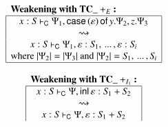 \documentclass{lmcs}
\newcommand{\DualLNLLogicnt}[1]{\mathit{#1}}
\newcommand{\DualLNLLogicmv}[1]{\mathit{#1}}
\newcommand{\DualLNLLogicsym}[1]{#1}
\newcommand{\DualLNLLogicdrulename}[1]{\textsc{#1}}
\newcommand{\DualLNLLogicdruleTCXXdIOneName}[0]{\DualLNLLogicdrulename{TC\_dI1}}
\newcommand{\DualLNLLogicdruleTCXXdEName}[0]{\DualLNLLogicdrulename{TC\_dE}}
\renewcommand{\DualLNLLogicdrulename}[1]{#1}
\renewcommand{\DualLNLLogicdruleTCXXdIOneName}{\text{TC\_}+_{I_1}}
\renewcommand{\DualLNLLogicdruleTCXXdEName}{\text{TC\_}+_E}
\begin{document}
\begin{figure}
  \begin{mdframed}
    \begin{center}
    \begin{math}
      \begin{array}{c}    
        \begin{array}{|c|}
          \multicolumn{1}{l}{\textbf{\textbf{Weakening with $\DualLNLLogicdruleTCXXdEName{}$}:}}\\
          \hline
            \DualLNLLogicmv{x}  :  \DualLNLLogicnt{S}  \vdash_{\mathsf{C} }  \Psi_{{\mathrm{1}}}  \DualLNLLogicsym{,}   \mathsf{case}\, \DualLNLLogicsym{(}   \varepsilon   \DualLNLLogicsym{)} \,\mathsf{of}\, \DualLNLLogicmv{y} . \Psi_{{\mathrm{2}}} ,  \DualLNLLogicmv{z} . \Psi_{{\mathrm{3}}}  \\
           \rightsquigarrow\\
            \DualLNLLogicmv{x}  :  \DualLNLLogicnt{S}  \vdash_{\mathsf{C} }  \Psi_{{\mathrm{1}}}  \DualLNLLogicsym{,}   \varepsilon   \DualLNLLogicsym{:}  \DualLNLLogicnt{S_{{\mathrm{1}}}}  \DualLNLLogicsym{,} \, ... \, \DualLNLLogicsym{,}   \varepsilon   \DualLNLLogicsym{:}  \DualLNLLogicnt{S_{\DualLNLLogicmv{i}}} \\
           \text{where } \DualLNLLogicsym{\mbox{$\mid$}}  \Psi_{{\mathrm{2}}}  \DualLNLLogicsym{\mbox{$\mid$}}  \DualLNLLogicsym{=}  \DualLNLLogicsym{\mbox{$\mid$}}  \Psi_{{\mathrm{3}}}  \DualLNLLogicsym{\mbox{$\mid$}} \text{ and } |\Psi_{{\mathrm{2}}}| = \DualLNLLogicnt{S_{{\mathrm{1}}}}  \DualLNLLogicsym{,} \, ... \, \DualLNLLogicsym{,}  \DualLNLLogicnt{S_{\DualLNLLogicmv{i}}}\\    
          \hline
        \end{array}\\
        \\
        \begin{array}{cc}
          \begin{array}{|c|}
          \multicolumn{1}{l}{\textbf{\textbf{Weakening with $\DualLNLLogicdruleTCXXdIOneName{}$}:}}\\
          \hline
            \DualLNLLogicmv{x}  :  \DualLNLLogicnt{S}  \vdash_{\mathsf{C} }  \Psi  \DualLNLLogicsym{,}   \mathsf{inl}\,  \varepsilon    \DualLNLLogicsym{:}   \DualLNLLogicnt{S_{{\mathrm{1}}}}  +  \DualLNLLogicnt{S_{{\mathrm{2}}}}  \\
           \rightsquigarrow\\
            \DualLNLLogicmv{x}  :  \DualLNLLogicnt{S}  \vdash_{\mathsf{C} }  \Psi  \DualLNLLogicsym{,}   \varepsilon   \DualLNLLogicsym{:}   \DualLNLLogicnt{S_{{\mathrm{1}}}}  +  \DualLNLLogicnt{S_{{\mathrm{2}}}}  \\               

\end{array}
\end{array}
\end{array}
\end{math}
\end{center}
\end{mdframed}
\end{figure}
\end{document}
